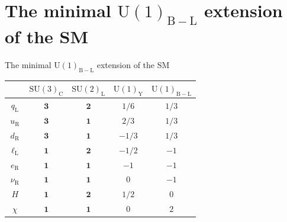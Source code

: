 \documentclass[10pt,xcolor=dvipsnames,mathserif]{beamer}
\renewcommand{\(}{\left(}
\renewcommand{\)}{\right)}
\renewcommand{\[}{\left[}
\renewcommand{\]}{\right]}
\newcommand{\U}[1]{\mathrm{U}(1)_{\mathrm{#1}}}			%
\newcommand{\SU}[2]{\mathrm{SU}(#1)_{\mathrm{#2}}}		%
\begin{document}
\section{The minimal $\U{B-L}$ extension of the SM}

\begin{frame}{The minimal $\U{B-L}$ extension of the SM}
	
%
\begin{table}[htb!]
	\begin{center}
		\begin{tabular}{ccccc}
			\toprule                     
			& $\SU{3}{C}$ & $\SU{2}{L}$ & $\U{Y}$ & $\U{B-L}$  	\\    
			\midrule
			$q_\mathrm{L}$     			    							& $\bm{3}$		& $\bm{2}$	&	$1/6$ & $1/3$	\\
			$u_\mathrm{R}$     			    							& $\bm{3}$		& $\bm{1}$	&	$2/3$ & $1/3$	\\
			$d_\mathrm{R}$     			    							& $\bm{3}$		& $\bm{1}$	&	$-1/3$ & $1/3$	\\
			$\ell_\mathrm{L}$     			    							& $\bm{1}$		& $\bm{2}$	&	$-1/2$ & $-1$	\\
			$e_\mathrm{R}$     			    							& $\bm{1}$		& $\bm{1}$	&	$-1$ & $-1$	\\
			$\nu_\mathrm{R}$     			    							& $\bm{1}$		& $\bm{1}$	&	$0$ & $-1$	\\
			\hdashline
			$H$     			    							& $\bm{1}$		& $\bm{2}$	&	$1/2$ & $0$	\\
			$\chi$     			    							& $\bm{1}$		& $\bm{1}$	&	$0$ & $2$	\\
			\bottomrule
		\end{tabular} 
	\end{center}
\end{table} 
%


	
\end{frame}
\end{document}
